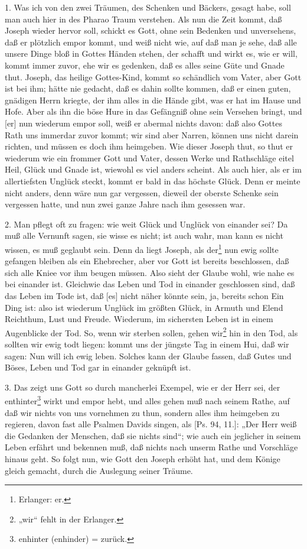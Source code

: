 1. Was ich von den zwei Träumen, des Schenken und Bäckers, gesagt habe, soll man auch hier in des Pharao Traum verstehen. Als nun die Zeit kommt, daß Joseph wieder hervor soll, schickt es Gott, ohne sein Bedenken und unversehens, daß er plötzlich empor kommt, und weiß nicht wie, auf daß man je sehe, daß alle unsere Dinge bloß in Gottes Händen stehen, der schafft und wirkt es, wie er will, kommt immer zuvor, ehe wir es gedenken, daß es alles seine Güte und Gnade thut. Joseph, das heilige Gottes-Kind, kommt so schändlich vom Vater, aber Gott ist bei ihm; hätte nie gedacht, daß es dahin sollte kommen, daß er einen guten, gnädigen Herrn kriegte, der ihm alles in die Hände gibt, was er hat im Hause und Hofe. Aber als ihn die böse Hure in das Gefängniß ohne sein Versehen bringt, und [er] nun wiederum empor soll, weiß er abermal nichts davon: daß also Gottes Rath uns immerdar zuvor kommt; wir sind aber Narren, können uns nicht darein richten, und müssen es doch ihm heimgeben. Wie dieser Joseph thut, so thut er wiederum wie ein frommer Gott und Vater, dessen Werke und Rathschläge eitel Heil, Glück und Gnade ist, wiewohl es viel anders scheint. Als auch hier, als er im allertiefsten Unglück steckt, kommt er bald in das höchste Glück. Denn er meinte nicht anders, denn wäre nun gar vergessen, dieweil der oberste Schenke sein vergessen hatte, und nun zwei ganze Jahre nach ihm gesessen war.

2. Man pflegt oft zu fragen: wie weit Glück und Unglück von einander sei? Da muß alle Vernunft sagen, sie wisse es nicht; ist auch wahr, man kann es nicht wissen, es muß geglaubt sein. Denn da liegt Joseph, als der\footnote{Erlanger: er.} nun ewig sollte gefangen bleiben als ein Ehebrecher, aber vor Gott ist bereits beschlossen, daß sich alle Kniee vor ihm beugen müssen. Also sieht der Glaube wohl, wie nahe es bei einander ist. Gleichwie das Leben und Tod in einander geschlossen sind, daß das Leben im Tode ist, daß [es] nicht näher könnte sein, ja, bereits schon Ein Ding ist: also ist wiederum Unglück im größten Glück, in Armuth und Elend Reichthum, Lust und Freude. Wiederum, im sichersten Leben ist in einem Augenblicke der Tod. So, wenn wir sterben sollen, gehen wir\footnote{„wir“ fehlt in der Erlanger.} hin in den Tod, als sollten wir ewig todt liegen: kommt uns der jüngste Tag in einem Hui, daß wir sagen: Nun will ich ewig leben. Solches kann der Glaube fassen, daß Gutes und Böses, Leben und Tod gar in einander geknüpft ist.

3. Das zeigt uns Gott so durch mancherlei Exempel, wie er der Herr sei, der enthinter\footnote{enhinter (enhinder) = zurück.} wirkt und empor hebt, und alles gehen muß nach seinem Rathe, auf daß wir nichts von uns vornehmen zu thun, sondern alles ihm heimgeben zu regieren, davon fast alle Psalmen Davids singen, als [Ps. 94, 11.]: „Der Herr weiß die Gedanken der Menschen, daß sie nichts sind“; wie auch ein jeglicher in seinem Leben erfährt
und bekennen muß, daß nichts nach unserm Rathe und Vorschläge hinaus geht. So folgt nun, wie Gott den Joseph erhöht hat, und dem Könige gleich gemacht, durch die Auslegung seiner Träume.

